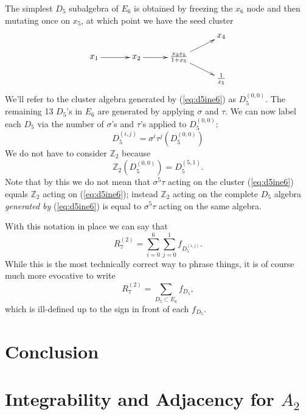 \documentclass[11pt]{article}
\def\pdfeq#1{\texorpdfstring{$#1$}{a}}
\def\fd5{f_{D_5}}
\begin{document}
The simplest $D_5$ subalgebra of $E_6$ is obtained by freezing the $x_6$ node and then mutating once on $x_5$, at which point we have the seed cluster
\begin{equation}\label{eq:d5ine6}
\begin{gathered}
\begin{xy} 0;<1pt,0pt>:<0pt,-1pt>::
	(0,25) *+{x_1} ="1",
	(50,25) *+{x_2} ="2",
	(100,25) *+{\frac{x_3 x_5}{1+x_5}} ="3",
	(150,0) *+{x_4} ="4",
	(150,50) *+{\frac{1}{x_5}} ="5",
	"1", {\ar"2"},
	"2", {\ar"3"},
	"3", {\ar"4"},
	"3", {\ar"5"},
\end{xy}
\end{gathered}
\end{equation}
We'll refer to the cluster algebra generated by (\ref{eq:d5ine6}) as $D_5^{(0,0)}$. The remaining 13 $D_5$'s in $E_6$ are generated by applying $\sigma$ and $\tau$. We can now label each $D_5$ via the number of $\sigma$'s and $\tau$'s applied to $D_5^{(0,0)}$:
\begin{equation}
	D_5^{(i,j)} = \sigma^{i}\tau^j(D_5^{(0,0)})
\end{equation}
We do not have to consider $\mathbb{Z}_2$ because 
\begin{equation}
	\mathbb{Z}_2(D_5^{(0,0)}) = D_5^{(5,1)}.
\end{equation}
Note that by this we do not mean that $\sigma^5\tau$ acting on the cluster (\ref{eq:d5ine6}) equals $\mathbb{Z}_2$ acting on (\ref{eq:d5ine6}); instead $\mathbb{Z}_2$ acting on the complete $D_5$ algebra \emph{generated by} (\ref{eq:d5ine6}) is equal to $\sigma^5\tau$ acting on the same algebra.

With this notation in place we can say that 
\begin{equation}
	R^{(2)}_7 = \sum_{i=0}^{6}\sum_{j=0}^{1} f_{D_5^{(i,j)}}.
\end{equation}
While this is the most technically correct way to phrase things, it is of course much more evocative to write
\begin{equation}
	R^{(2)}_7 = \sum_{D_5\subset E_6} f_{D_5},
\end{equation}
which is ill-defined up to the sign in front of each $\fd5$. 


\section{Conclusion}

\appendix

\section{Integrability and Adjacency for \pdfeq{A_2}}
\end{document}
